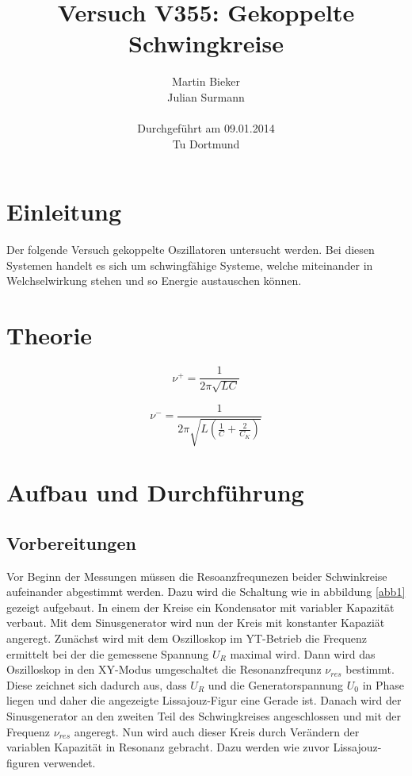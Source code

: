 \documentclass[11pt,ngerman,a4paper]{article}
\title{\textbf{Versuch V355: Gekoppelte Schwingkreise}}
\author{Martin Bieker\\
		Julian Surmann\\
		\\
		Durchgef\"{u}hrt am 09.01.2014\\
		Tu Dortmund}
\date{}
\begin{document}
\renewcommand\tablename{Tabelle}
\renewcommand\figurename{Abbildung}
\maketitle
\thispagestyle{empty}
\newpage
\clearpage
\setcounter{page}{1}


\section{Einleitung}
Der folgende Versuch gekoppelte Oszillatoren untersucht werden. Bei diesen Systemen handelt es sich um schwingfähige Systeme, welche miteinander in Welchselwirkung stehen und so Energie austauschen können. 

\section{Theorie}
\begin{equation}
\nu^+ = \frac{1}{2 \pi \sqrt{LC}}
\end{equation}

\begin{equation}
\nu^- =\frac1{2\pi\sqrt{L(\frac1C + \frac2{C_K})}}
\end{equation}


\section{Aufbau und Durchf\"{u}hrung}
\subsection{Vorbereitungen}
Vor Beginn der Messungen müssen die Resoanzfrequnezen beider Schwinkreise aufeinander abgestimmt werden. Dazu wird die Schaltung wie in abbildung \ref{abb1} gezeigt aufgebaut. In einem der Kreise ein Kondensator mit variabler Kapazität verbaut. Mit dem Sinusgenerator wird nun der Kreis mit konstanter Kapazi\"at angeregt. Zunächst wird mit dem Oszilloskop im YT-Betrieb die Frequenz ermittelt bei der die gemessene Spannung $U_R$ maximal wird. Dann wird das Oszilloskop in den XY-Modus umgeschaltet die Resonanzfrequnz $\nu_{res}$ bestimmt. Diese zeichnet sich dadurch aus, dass $U_R$ und die Generatorspannung $U_0$ in Phase liegen und daher die angezeigte Lissajouz-Figur eine Gerade ist. Danach wird der Sinusgenerator an den zweiten Teil des Schwingkreises angeschlossen und mit der Frequenz $\nu_{res}$ angeregt. Nun wird auch dieser Kreis durch Verändern der variablen Kapazität in Resonanz gebracht. Dazu werden wie zuvor Lissajouz-figuren verwendet. 
\end{document}
